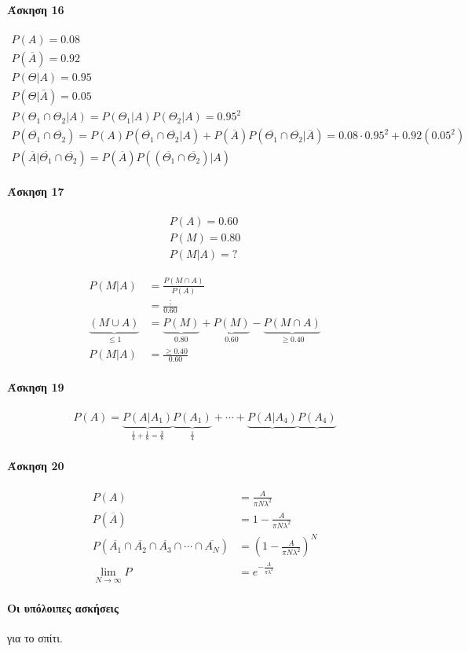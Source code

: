 \documentclass[11pt,a4paper,titlepage,draft]{article}
\begin{document}
\paragraph{Άσκηση 16}
\begin{gather*}
P(A) = 0.08 \\
P(\overline{A}) = 0.92 \\
P(\Theta | A) = 0.95 \\
P(\Theta | \bar{A}) = 0.05 \\
P(\Theta_1 \cap \Theta_2 | A) = P(\Theta_1|A)P(\Theta_2|A) = 0.95^2 \\
P(\overline{\Theta_1} \cap \overline{\Theta_2}) = P(A)P(\overline{\Theta_1} \cap \overline{\Theta_2} | A)
+ P (\overline{A}) P (\overline{\Theta_1} \cap \overline{\Theta_2}|\overline{A})
= 0.08 \cdot 0.95^2 + 0.92 \left( 0.05^2 \right) \\
P(\overline{A}| \overline{\Theta_1} \cap \overline{\Theta_2})
= P(\overline{A})P\left((\overline{\Theta_1} \cap \overline{\Theta_2})|A\right)
\end{gather*}

\paragraph{Άσκηση 17}
\begin{gather*}
P(A) = 0.60 \\
P(M) = 0.80 \\
P(M|A) = ?
\end{gather*}

\begin{align*}
P(M|A) &= \frac{P(M \cap A)}{P(A)}
\\ &= \frac{;}{0.60}
\\
\underbrace{(M \cup A)}_{\leq 1} &=
\underbrace{P(M)}_{0.80}
+\underbrace{P(M)}_{0.60}
-\underbrace{P(M\cap A)}_{\geq 0.40}
\\ P(M|A) &= \frac{\geq 0.40}{0.60}
\end{align*}

\paragraph{Άσκηση 19}
\begin{align*}
P(A) =
\underbrace{P(A|A_1)}_{\frac{1}{4}+\frac{1}{8}=\frac{3}{8}}
\underbrace{P(A_1)}_\frac{1}{4}
+\cdots
+\underbrace{P(A|A_4)}
\underbrace{P(A_4)}
\end{align*}

\paragraph{Άσκηση 20}
\begin{align*}
P(A) &= \frac{A}{\pi N \lambda^2} \\
P(\overline{A}) &= 1 -\frac{A}{\pi N \lambda^2} \\
P(\overline{A_1}\cap\overline{A_2}\cap\overline{A_3}\cap\cdots\cap\overline{A_N}) &=
\left(
1- \frac{A}{\pi N \lambda^2}
\right)^N \\
\lim_{N\to \infty} P &= e^{-\frac{A}{\pi \lambda^2}}
\end{align*}

\paragraph{Οι υπόλοιπες ασκήσεις}
για το σπίτι.
\end{document}
